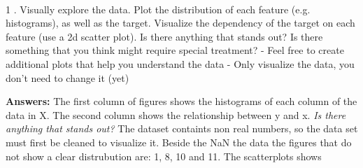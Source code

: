 \documentclass[11pt]{article}
\begin{document}
    \begin{center}
    \end{center}
    { \hspace*{\fill} \\}
    
    \begin{center}
    \end{center}
    { \hspace*{\fill} \\}
    
    \begin{center}
    \end{center}
    { \hspace*{\fill} \\}
    
    \begin{center}
    \end{center}
    { \hspace*{\fill} \\}
    
    \begin{center}
    \end{center}
    { \hspace*{\fill} \\}
    
    \begin{center}
    \end{center}
    { \hspace*{\fill} \\}
    
    1 . Visually explore the data. Plot the distribution of each feature
(e.g. histograms), as well as the target. Visualize the dependency of
the target on each feature (use a 2d scatter plot). Is there anything
that stands out? Is there something that you think might require special
treatment? - Feel free to create additional plots that help you
understand the data - Only visualize the data, you don't need to change
it (yet)

\textbf{Answers:} The first column of figures shows the histograms of
each column of the data in X. The second column shows the relationship
between y and x. \emph{Is there anything that stands out?} The dataset
containts non real numbers, so the data set must first be cleaned to
visualize it. Beside the NaN the data the figures that do not show a
clear distrubution are: 1, 8, 10 and 11. The scatterplots shows
\end{document}
